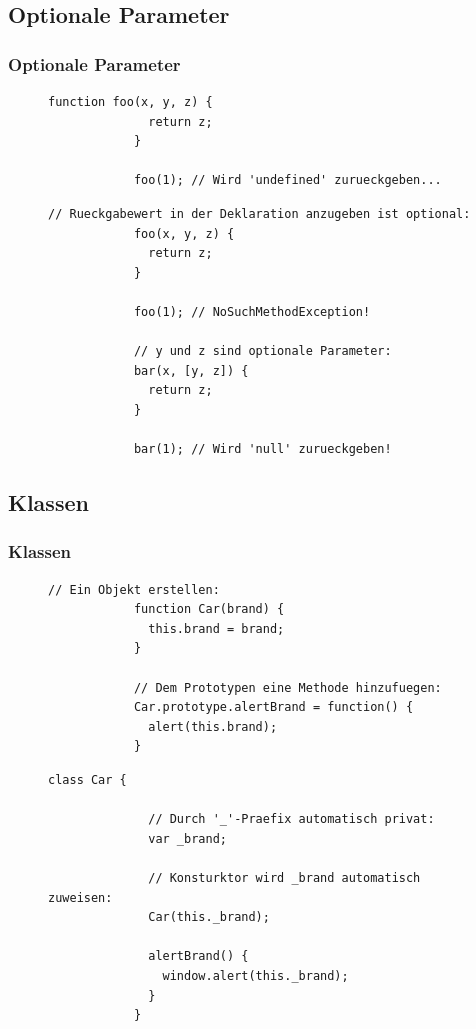 \documentclass{beamer}
\begin{document}
\subsection{Optionale Parameter}
\begin{frame}[fragile]
\frametitle{Optionale Parameter}
\begin{figure}[!h]
	\begin{minipage}{0.49\textwidth}
		\centering
		\begin{lstlisting}[lang=Javascript,basicstyle=\scriptsize]
			function foo(x, y, z) {
			  return z;
			}

			foo(1); // Wird 'undefined' zurueckgeben...
		\end{lstlisting}
	\end{minipage}
	\begin{minipage}{0.49\textwidth}
		\centering
		\begin{lstlisting}[basicstyle=\scriptsize]
			// Rueckgabewert in der Deklaration anzugeben ist optional:
			foo(x, y, z) {
			  return z;
			}

			foo(1); // NoSuchMethodException!

			// y und z sind optionale Parameter:
			bar(x, [y, z]) {
			  return z;
			}

			bar(1); // Wird 'null' zurueckgeben!
		\end{lstlisting}
	\end{minipage}
\end{figure}
\end{frame}

\subsection{Klassen}
\begin{frame}[fragile]
\frametitle{Klassen}
\begin{figure}[!h]
	\begin{minipage}{0.49\textwidth}
		\centering
		\begin{lstlisting}[lang=Javascript,basicstyle=\scriptsize]
			// Ein Objekt erstellen:
			function Car(brand) {
			  this.brand = brand;
			}

			// Dem Prototypen eine Methode hinzufuegen:
			Car.prototype.alertBrand = function() {
			  alert(this.brand);
			}
		\end{lstlisting}
	\end{minipage}
	\begin{minipage}{0.49\textwidth}
		\centering
		\begin{lstlisting}[basicstyle=\scriptsize]
			class Car {
			
			  // Durch '_'-Praefix automatisch privat:
			  var _brand;
			
			  // Konsturktor wird _brand automatisch zuweisen:
			  Car(this._brand);

			  alertBrand() {
			    window.alert(this._brand);
			  }
			}
		\end{lstlisting}
	\end{minipage}
\end{figure}
\end{frame}
\end{document}
